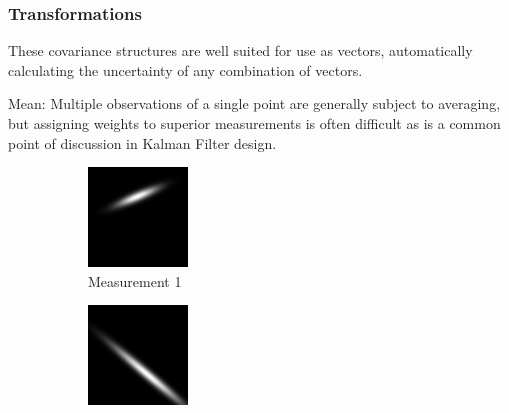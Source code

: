 \documentclass[a4paper, 11pt, titlepage]{article}
\begin{document}
    \subsubsection{Transformations}
      These covariance structures are well suited for use as vectors, automatically calculating the uncertainty of any combination of vectors.
      
      Mean:
      Multiple observations of a single point are generally subject to averaging, but assigning weights to superior measurements is often difficult as is a common point of discussion in Kalman Filter design.
      \begin{figure}
      \centering
      \begin{subfigure}{.3\textwidth}
        \centering
        \includegraphics[width=.8\linewidth]{images/GaussianLine1.png}
        \caption{Measurement 1}
        \label{fig:uncProdsub1}
      \end{subfigure}%
      \begin{subfigure}{.3\textwidth}
        \centering
        \includegraphics[width=.8\linewidth]{images/GaussianLine2.png}

\end{subfigure}
\end{figure}
\end{document}
